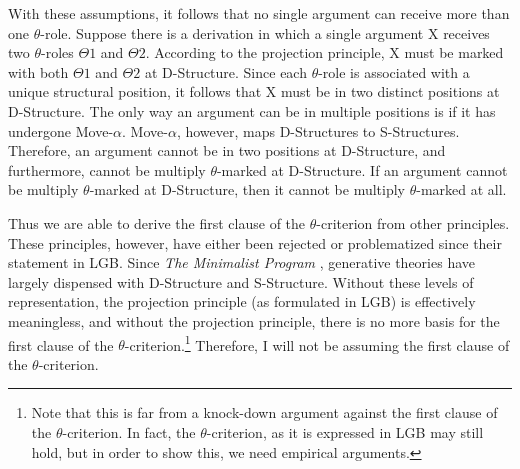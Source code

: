 \documentclass[MilwayThesis]{subfiles}
\begin{document}
With these assumptions, it follows that no single argument can receive more than one $\theta$-role.
Suppose there is a derivation in which a single argument X receives two $\theta$-roles $\Theta1$ and $\Theta2$.
According to the projection principle, X must be marked with both $\Theta1$ and $\Theta2$ at D-Structure.
Since each $\theta$-role is associated with a unique structural position, it follows that X must be in two distinct positions at D-Structure.
The only way an argument can be in multiple positions is if it has undergone Move-$\alpha$.
Move-$\alpha$, however, maps D-Structures to S-Structures.
Therefore, an argument cannot be in two positions at D-Structure, and furthermore, cannot be multiply $\theta$-marked at D-Structure.
If an argument cannot be multiply $\theta$-marked at D-Structure, then it cannot be multiply $\theta$-marked at all.

Thus we are able to derive the first clause of the $\theta$-criterion from other principles.
These principles, however, have either been rejected or problematized since their statement in LGB.
Since \textit{The Minimalist Program} \parencite{chomsky1995minimalist}, generative theories have largely dispensed with D-Structure and S-Structure.
Without these levels of representation, the projection principle (as formulated in LGB) is effectively meaningless, and without the projection principle, there is no more basis for the first clause of the $\theta$-criterion.\footnote{
	Note that this is far from a knock-down argument against the first clause of the $\theta$-criterion.
	In fact, the $\theta$-criterion, as it is expressed in LGB may still hold, but in order to show this, we need empirical arguments.
}
Therefore, I will not be assuming the first clause of the $\theta$-criterion.
\end{document}
